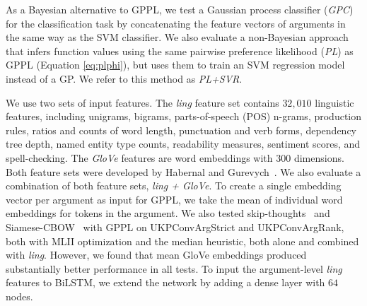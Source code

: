 



As a Bayesian alternative to GPPL, 
we test a Gaussian process classifier (\emph{GPC}) for the classification task 
by concatenating the feature vectors of arguments in the same way as the SVM classifier.
We also evaluate a non-Bayesian approach that infers function values using the 
same pairwise preference likelihood (\emph{PL}) as GPPL
(Equation \ref{eq:plphi}), 
but uses them to train an SVM regression model instead of a GP. 
We refer to this method as \emph{PL+SVR}.

We use two sets of input features. The \emph{ling} feature set contains $32,010$ linguistic features,  
including unigrams, bigrams, parts-of-speech (POS) n-grams, production rules,
ratios and counts of word length, punctuation and verb forms,
dependency tree depth, named entity type counts,
readability measures, sentiment scores, and spell-checking.
The \emph{GloVe} features are word embeddings with 300 dimensions. Both feature sets were
developed by Habernal and Gurevych~.
We also evaluate a combination of both feature sets, \emph{ling + GloVe}.
To create a single embedding vector per argument as input for GPPL,
we take the mean of individual word embeddings for tokens in the argument.
We also tested skip-thoughts~\cite{kiros2015skip} and Siamese-CBOW~\cite{kenter2016siamesecbow} 
with GPPL on UKPConvArgStrict and UKPConvArgRank, both with MLII optimization and the median heuristic,
 both alone and combined with \emph{ling}. 
However, we found that mean GloVe embeddings produced substantially better performance in all tests.
To input the argument-level \emph{ling} features to BiLSTM, we extend the network by adding a dense layer with $64$ nodes. 

